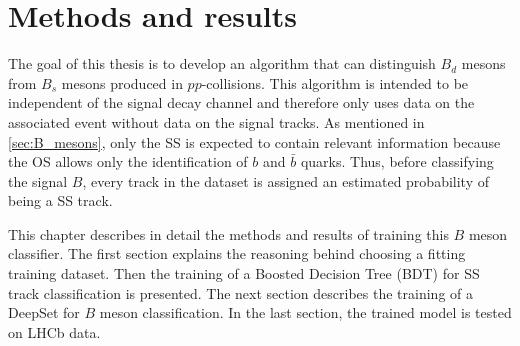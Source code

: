 \chapter{Methods and results} %


The goal of this thesis is to develop an algorithm that can distinguish $B_d$ mesons from $B_s$ mesons produced in $pp$-collisions.
This algorithm is intended to be independent of the signal decay channel and therefore only uses data on the associated event without data on the signal tracks.
As mentioned in \autoref{sec:B_mesons}, only the SS is expected to contain relevant information because the OS allows only the identification of $b$ and $\bar{b}$ quarks.
Thus, before classifying the signal $B$, every track in the dataset is assigned an estimated probability of being a SS track.

This chapter describes in detail the methods and results of training this $B$ meson classifier.
The first section explains the reasoning behind choosing a fitting training dataset.
Then the training of a Boosted Decision Tree (BDT) for SS track classification is presented.
The next section describes the training of a DeepSet for $B$ meson classification.
In the last section, the trained model is tested on LHCb data.




